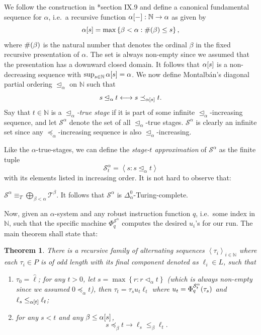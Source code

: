 \documentclass[11pt]{article}
\theoremstyle{plain}
\newtheorem{theorem}{Theorem}[section]
\theoremstyle{definition}
\newcommand{\tuple}[1]{\left\langle #1 \right\rangle}
\begin{document}
We follow the construction in \cite{montalban26-computable-structure}*{section IX.9} and define a canonical fundamental sequence for $\alpha$, i.e.\ a recursive function $\alpha\mleft[{-}\mright] : \mathbb{N} \rightarrow \alpha$ as given by
\[\alpha\mleft[s\mright] = \max \left\{\beta < \alpha : \#\mleft(\beta\mright) \leq s\right\},\]
where $\#\mleft(\beta\mright)$ is the natural number that denotes the ordinal $\beta$ in the fixed recursive presentation of $\alpha$. The set is always non-empty since we assumed that the presentation has a downward closed domain. It follows that $\alpha\mleft[s\mright]$ is a non-decreasing sequence with $\sup_{s \in \mathbb{N}} \alpha\mleft[s\mright] = \alpha$. We now define Montalb\'an's diagonal partial ordering $\unlhd_\alpha$ on $\mathbb{N}$ such that
\[s \unlhd_\alpha t \longleftrightarrow s \preceq_{\alpha\mleft[s\mright]} t.\]
Say that $t \in \mathbb{N}$ is a \emph{$\unlhd_\alpha$-true stage} if it is part of some infinite $\unlhd_\alpha$-increasing sequence, and let $\mathcal{S}^\alpha$ denote the set of all $\unlhd_\alpha$-true stages. $\mathcal{S}^\alpha$ is clearly an infinite set since any $\preceq_\alpha$-increasing sequence is also $\unlhd_\alpha$-increasing.

Like the $\alpha$-true-stages, we can define the \emph{stage-$t$ approximation} of $\mathcal{S}^\alpha$ as the finite tuple
\[\mathcal{S}^\alpha_t = \tuple{s : s \unlhd_\alpha t}\]
with its elements listed in increasing order. It is not hard to observe that:

\begin{lemma}
  $\mathcal{S}^\alpha \equiv_T \bigoplus_{\beta < \alpha} \mathcal{T}^\beta$. It follows that $\mathcal{S}^\alpha$ is $\Delta^0_\alpha$-Turing-complete.
\end{lemma}

Now, given an $\alpha$-system and any robust instruction function $q$, i.e.\ some index in $\mathbb{N}$, such that the specific machine $\Phi_q^{\mathcal{S}^\alpha}$ computes the desired $u_i$'s for our run. The main theorem shall state that:

\begin{theorem}
  \label{thm:robust-limit-main}
  There is a recursive family of alternating sequences $\tuple{\tau_i}_{i \in \mathbb{N}}$ where each $\tau_i \in P$ is of odd length with its final component denoted as $\ell_i \in L$, such that
  \begin{enumerate}[label=\textnormal{(\alph*)}]
    \item $\tau_0 = \hat{\ell}$; for any $t > 0$, let $s = \max \left\{r : r \lhd_\alpha t\right\}$ (which is always non-empty since we assumed $0 \preceq_\alpha t$), then $\tau_t = \tau_s u_t \ell_t$ where $u_t = \Phi_q^{\mathcal{S}^\alpha_t}\mleft(\tau_s\mright)$ and $\ell_s \leq_{\alpha\mleft[t\mright]} \ell_t$;
    \item for any $s < t$ and any $\beta \leq \alpha\mleft[s\mright]$,
          \[s \preceq_\beta t \longrightarrow \ell_s \leq_\beta \ell_t.
            \tag{MC}\]
  \end{enumerate}
\end{theorem}
\end{document}
